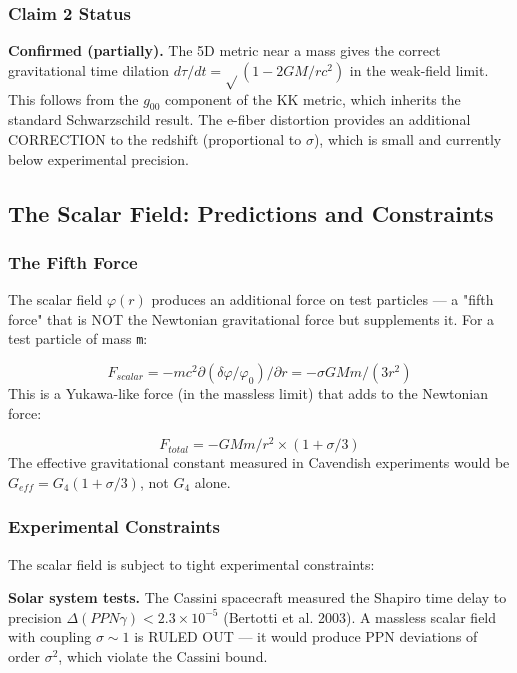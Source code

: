 \documentclass[aps,prd,preprint,superscriptaddress,longbibliography,floatfix]{revtex4-2}
\theoremstyle{remark}
\begin{document}
\subsubsection{Claim 2 Status}

\textbf{Confirmed (partially).} The 5D metric near a mass gives the correct gravitational time dilation $d\tau/dt = \sqrt{}(1 - 2GM/rc^{2})$ in the weak-field limit. This follows from the $g_{00}$ component of the KK metric, which inherits the standard Schwarzschild result. The e-fiber distortion provides an additional CORRECTION to the redshift (proportional to $\sigma$), which is small and currently below experimental precision.



\subsection{The Scalar Field: Predictions and Constraints}


\subsubsection{The Fifth Force}

The scalar field $\varphi(r)$ produces an additional force on test particles --- a "fifth force" that is NOT the Newtonian gravitational force but supplements it. For a test particle of mass \texttt{m}:


\begin{equation}
    F_{scalar} = -mc^{2} \partial(\delta\varphi/\varphi_{0})/\partial r = -\sigma GMm/(3r^{2})
\end{equation}
This is a Yukawa-like force (in the massless limit) that adds to the Newtonian force:


\begin{equation}
    F_{total} = -GMm/r^{2} \times (1 + \sigma/3)
\end{equation}
The effective gravitational constant measured in Cavendish experiments would be $G_{eff} = G_{4}(1 + \sigma/3)$, not $G_{4}$ alone.


\subsubsection{Experimental Constraints}

The scalar field is subject to tight experimental constraints:

\textbf{Solar system tests.} The Cassini spacecraft measured the Shapiro time delay to precision $\Delta(PPN \gamma) < 2.3 \times 10^{-5}$ (Bertotti et al. 2003). A massless scalar field with coupling $\sigma \sim 1$ is RULED OUT --- it would produce PPN deviations of order $\sigma^{2}$, which violate the Cassini bound.
\end{document}
